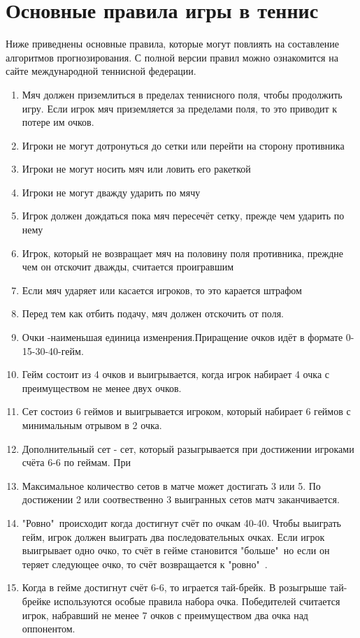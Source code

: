\section{Основные правила игры в теннис}
Ниже приведнены основные правила, которые могут повлиять на составление алгоритмов прогнозирования. С полной версии правил можно ознакомится на сайте международной теннисной федерации\cite{Book04}.
 \begin{enumerate}
	\item  Мяч должен приземлиться в пределах теннисного поля, чтобы продолжить игру. Если игрок мяч приземляется за пределами поля, то это приводит к потере им очков.
	\item Игроки не могут дотронуться до сетки или перейти на сторону противника
	\item Игроки не могут носить мяч или ловить его ракеткой
	\item Игроки не могут дважду ударить по мячу
    \item Игрок должен дождаться пока мяч пересечёт сетку, прежде чем ударить по нему
    \item Игрок, который не возвращает мяч на половину поля противника, преждне чем он отскочит дважды, считается проигравшим
    \item Если мяч ударяет или касается игроков, то это карается штрафом
    \item Перед тем как отбить подачу, мяч должен отскочить от поля.
    \item Очки -наименьшая единица изменрения.Приращение очков идёт в формате 0-15-30-40-гейм.
    \item Гейм состоит из 4 очков и выигрывается, когда игрок набирает 4 очка с преимуществом не менее двух очков.
    \item Сет состоиз 6 геймов и выигрывается игроком, который набирает 6 геймов 
 	 с минимальным отрывом в 2 очка.
 	 \item Дополнительный сет - сет, который разыгрывается при достижении игроками счёта 6-6 по геймам. При
  	\item Максимальное количество сетов в матче может достигать 3 или 5. По достижении 2 или соотвественно 3 выигранных сетов матч заканчивается.
  	\item "Ровно"\ происходит когда достигнут счёт по очкам 40-40. Чтобы выиграть гейм, игрок должен выиграть два последовательных очках. Если игрок выигрывает одно очко, то счёт в гейме становится "больше"\, но если он теряет следующее очко, то счёт возвращается к "ровно"\ .
  	\item Когда в гейме достигнут счёт 6-6, то играется тай-брейк. В розыгрыше тай-брейке используются особые правила набора очка. Победителей считается игрок, набравший не менее 7 очков с преимуществом два очка над оппонентом.
\end{enumerate}

